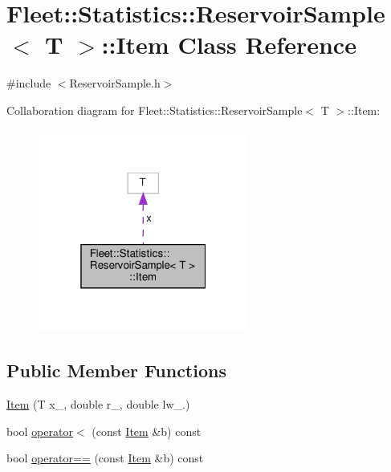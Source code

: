 \hypertarget{class_fleet_1_1_statistics_1_1_reservoir_sample_1_1_item}{}\section{Fleet\+:\+:Statistics\+:\+:Reservoir\+Sample$<$ T $>$\+:\+:Item Class Reference}
\label{class_fleet_1_1_statistics_1_1_reservoir_sample_1_1_item}


{\ttfamily \#include $<$Reservoir\+Sample.\+h$>$}



Collaboration diagram for Fleet\+:\+:Statistics\+:\+:Reservoir\+Sample$<$ T $>$\+:\+:Item\+:\nopagebreak
\begin{figure}[H]
\begin{center}
\leavevmode
\includegraphics[width=196pt]{class_fleet_1_1_statistics_1_1_reservoir_sample_1_1_item__coll__graph}
\end{center}
\end{figure}
\subsection*{Public Member Functions}
\begin{DoxyCompactItemize}
\item 
\hyperlink{class_fleet_1_1_statistics_1_1_reservoir_sample_1_1_item_acad6abfadffe65005f14a4c9616aabde}{Item} (T x\+\_\+, double r\+\_\+, double lw\+\_.)
\item 
bool \hyperlink{class_fleet_1_1_statistics_1_1_reservoir_sample_1_1_item_a06bf92e43a3bfe61e75a8bf0d6fa2c67}{operator$<$} (const \hyperlink{class_fleet_1_1_statistics_1_1_reservoir_sample_1_1_item}{Item} \&b) const
\item 
bool \hyperlink{class_fleet_1_1_statistics_1_1_reservoir_sample_1_1_item_ab3adc1f593aec74d7d140f8c3553546e}{operator==} (const \hyperlink{class_fleet_1_1_statistics_1_1_reservoir_sample_1_1_item}{Item} \&b) const
\end{DoxyCompactItemize}
